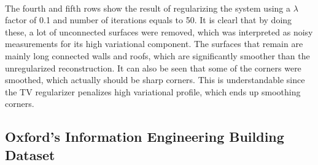 \documentclass[12pt]{article}
\begin{document}
	\paragraph{}
	The fourth and fifth rows show the result of regularizing the system using a $\lambda$ factor of 0.1 and number of iterations equals to 50. It is clearl that by doing these, a lot of unconnected surfaces were removed, which was interpreted as noisy measurements for its high variational component. The surfaces that remain are mainly long connected walls and roofs, which are significantly smoother than the unregularized reconstruction. It can also be seen that some of the corners were smoothed, which actually should be sharp corners. This is understandable since the TV regularizer penalizes high variational profile, which ends up smoothing corners.
		
	\subsection{Oxford's Information Engineering Building Dataset}
	
\end{document}
